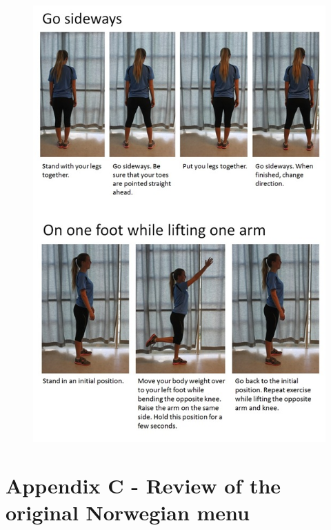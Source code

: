 \begin{figure} [ht!]
\centering
\includegraphics[scale=0.8]{GoSideways.jpg}
\label{gosideways}
\end{figure} 

\newpage
\section*{Appendix C - Review of the original Norwegian menu}
\label{app:menureview}

